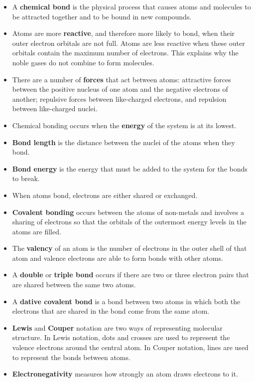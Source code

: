 
\begin{itemize}
\item{A \textbf{chemical bond} is the physical process that causes atoms and molecules to be attracted together and to be bound in new compounds.}
\item{Atoms are more \textbf{reactive}, and therefore more likely to bond, when their outer electron orbitals are not full. Atoms are less reactive when these outer orbitals contain the maximum number of electrons. This explains why the noble gases do not combine to form molecules.}
\item{There are a number of \textbf{forces} that act between atoms: attractive forces between the positive nucleus of one atom and the negative electrons of another; repulsive forces between like-charged electrons, and repulsion between like-charged nuclei.}
\item{Chemical bonding occurs when the \textbf{energy} of the system is at its lowest.}
\item{\textbf{Bond length} is the distance between the nuclei of the atoms when they bond.}
\item{\textbf{Bond energy} is the energy that must be added to the system for the bonds to break.}
\item{When atoms bond, electrons are either shared or exchanged.}
\item{\textbf{Covalent bonding} occurs between the atoms of non-metals and involves a sharing of electrons so that the orbitals of the outermost energy levels in the atoms are filled.}
\item{The \textbf{valency} of an atom is the number of electrons in the outer shell of that atom and valence electrons are able to form bonds with other atoms.}
\item{A \textbf{double} or \textbf{triple bond} occurs if there are two or three electron pairs that are shared between the same two atoms.}
\item{A \textbf{dative covalent bond} is a bond between two atoms in which both the electrons that are shared in the bond come from the same atom.}
\item{\textbf{Lewis} and \textbf{Couper} notation are two ways of representing molecular structure. In Lewis notation, dots and crosses are used to represent the valence electrons around the central atom. In Couper notation, lines are used to represent the bonds between atoms.}
\item{\textbf{Electronegativity} measures how strongly an atom draws electrons to it.}

\end{itemize}
